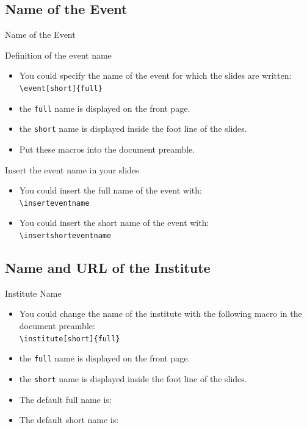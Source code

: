 \documentclass[english,sectioncirclenumberstyle]{ciadbeamer}
\begin{document}
\subsection{Name of the Event}

\begin{frame}[t]{Name of the Event}
	\begin{block}{Definition of the event name}
		\begin{itemize}
		\item You could specify the name of the event for which the slides are written: \\
			\texttt{{\textbackslash}event[short]\{full\}}
		\item the \texttt{full} name is displayed on the front page.
		\item the \texttt{short} name is displayed inside the foot line of the slides.
		\item Put these macros into the document preamble.
		\end{itemize}
	\end{block}
	\begin{block}{Insert the event name in your slides}
		\begin{itemize}
		\item You could insert the full name of the event with: \\
			\texttt{{\textbackslash}inserteventname}
		\item You could insert the short name of the event with: \\
			\texttt{{\textbackslash}insertshorteventname}
		\end{itemize}
	\end{block}
\end{frame}

\subsection{Name and URL of the Institute}
\begin{frame}{Institute Name}
	\begin{itemize}
	\item You could change the name of the institute with the following macro in the document preamble: \\
		\texttt{{\textbackslash}institute[short]\{full\}}
	\item the \texttt{full} name is displayed on the front page.
	\item the \texttt{short} name is displayed inside the foot line of the slides.
	\vspace{1em}
	\item The default full name is: \\
		{\smaller\insertinstitute}
	\item The default short name is: \insertshortinstitute
	\end{itemize}
\end{frame}
\end{document}
